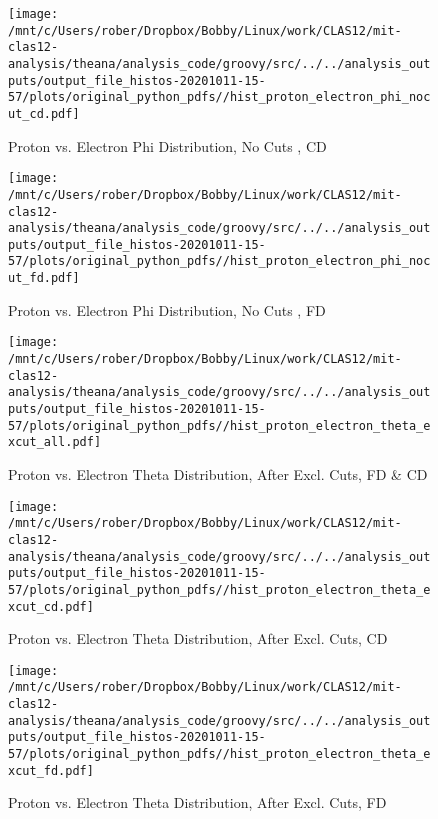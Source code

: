 \documentclass{article}
\begin{document}
\begin{landscape}
\begin{figure}[h]
        \texttt{[image: /mnt/c/Users/rober/Dropbox/Bobby/Linux/work/CLAS12/mit-clas12-analysis/theana/analysis\_code/groovy/src/../../analysis\_outputs/output\_file\_histos-20201011-15-57/plots/original\_python\_pdfs//hist\_proton\_electron\_phi\_nocut\_cd.pdf]}
        \captionsetup{textformat=empty,labelformat=blank}
        \caption{Proton vs. Electron Phi Distribution, No Cuts , CD}
    \end{figure}
    \clearpage
    
    \begin{figure}[h]
        \centering

        \texttt{[image: /mnt/c/Users/rober/Dropbox/Bobby/Linux/work/CLAS12/mit-clas12-analysis/theana/analysis\_code/groovy/src/../../analysis\_outputs/output\_file\_histos-20201011-15-57/plots/original\_python\_pdfs//hist\_proton\_electron\_phi\_nocut\_fd.pdf]}
        \captionsetup{textformat=empty,labelformat=blank}
        \caption{Proton vs. Electron Phi Distribution, No Cuts , FD}
    \end{figure}
    \clearpage
    
    \begin{figure}[h]
        \centering

        \texttt{[image: /mnt/c/Users/rober/Dropbox/Bobby/Linux/work/CLAS12/mit-clas12-analysis/theana/analysis\_code/groovy/src/../../analysis\_outputs/output\_file\_histos-20201011-15-57/plots/original\_python\_pdfs//hist\_proton\_electron\_theta\_excut\_all.pdf]}
        \captionsetup{textformat=empty,labelformat=blank}
        \caption{Proton vs. Electron Theta Distribution, After Excl. Cuts, FD \& CD}
    \end{figure}
    \clearpage
    
    \begin{figure}[h]
        \centering

        \texttt{[image: /mnt/c/Users/rober/Dropbox/Bobby/Linux/work/CLAS12/mit-clas12-analysis/theana/analysis\_code/groovy/src/../../analysis\_outputs/output\_file\_histos-20201011-15-57/plots/original\_python\_pdfs//hist\_proton\_electron\_theta\_excut\_cd.pdf]}
        \captionsetup{textformat=empty,labelformat=blank}
        \caption{Proton vs. Electron Theta Distribution, After Excl. Cuts, CD}
    \end{figure}
    \clearpage
    
    \begin{figure}[h]
        \centering

        \texttt{[image: /mnt/c/Users/rober/Dropbox/Bobby/Linux/work/CLAS12/mit-clas12-analysis/theana/analysis\_code/groovy/src/../../analysis\_outputs/output\_file\_histos-20201011-15-57/plots/original\_python\_pdfs//hist\_proton\_electron\_theta\_excut\_fd.pdf]}
        \captionsetup{textformat=empty,labelformat=blank}
        \caption{Proton vs. Electron Theta Distribution, After Excl. Cuts, FD}
    \end{figure}
    \clearpage
    

\end{landscape}
\end{document}
